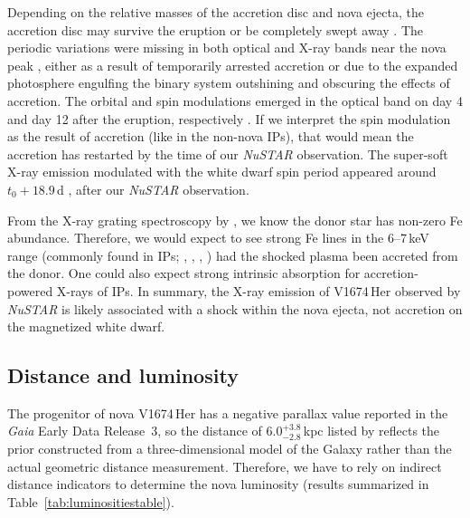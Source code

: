 \documentclass[a4paper,fleqn,usenatbib]{mnras}
\newcommand{\nova}{V1674\,Her}
\begin{document}
Depending on the relative masses of the accretion disc and nova ejecta, the
accretion disc may survive the eruption or be completely swept away
\citep{2010ApJ...720L.195D,2018A&A...613A...8F}.
%
The periodic variations were missing in both optical and X-ray bands near the nova peak
\citep{2021RNAAS...5..244H}, either as a result of temporarily arrested accretion
or due to the expanded photosphere engulfing the binary system outshining 
and obscuring the effects of accretion. 
%
The orbital and spin modulations emerged in the optical band on day 4 and day 12 after the
eruption, respectively \citep{2022ApJ...940L..56P}. If we interpret the
spin modulation as the result of accretion (like in the non-nova IPs), that
would mean the accretion has restarted by the time of our {\em NuSTAR}
observation.
%
The super-soft X-ray emission modulated with the white dwarf spin period
appeared around $t_0 + 18.9$\,d \citep{2021ATel14747....1P,2021ApJ...922L..42D}, 
after our {\em NuSTAR} observation. 

From the X-ray grating spectroscopy by \cite{2021ApJ...922L..42D}, we know 
the donor star has non-zero Fe abundance. Therefore, we would expect to see strong 
Fe lines in the 6--7\,keV range (commonly found in IPs; 
\citealt{2018MNRAS.476..554S}, \citealt{2018ApJ...852L...8L},
\citealt{2022MNRAS.511.4582C}, \citealt{2022A&A...657A..12J}) had the shocked plasma been accreted from the donor.
One could also expect strong intrinsic absorption for accretion-powered X-rays of IPs.
In summary, the X-ray emission of \nova{} observed by {\em NuSTAR} is likely associated 
with a shock within the nova ejecta, not accretion on the magnetized white dwarf. 


\subsection{Distance and luminosity}
\label{sec:distlum}

The progenitor of nova \nova{} has a negative parallax value reported in 
the {\em Gaia} Early Data Release~3, so the distance of $6.0^{+3.8}_{-2.8}$\,kpc 
listed by \cite{2021AJ....161..147B} reflects the prior constructed from a three-dimensional model of 
the Galaxy rather than the actual geometric distance measurement. 
Therefore, we have to rely on indirect distance indicators to determine 
the nova luminosity (results summarized in Table~\ref{tab:luminositiestable}).
\end{document}
